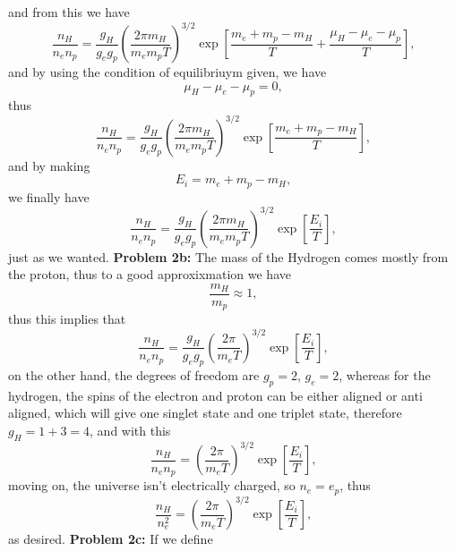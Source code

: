 \documentclass[11pt]{article}
\begin{document}
and from this we have
\begin{displaymath}
  \frac{n_H}{n_e n_p} = \frac{g_H}{g_e g_p} \left(\frac{2\pi m_H}{m_e m_p T}\right)^{3/2} \exp\left[ \frac{m_e + m_p - m_H}{T} + \frac{\mu_H - \mu_e - \mu_p}{T}\right],
\end{displaymath}
and by using the condition of equilibriuym given, we have 
\begin{displaymath}
  \mu_H - \mu_e - \mu_p =0,
\end{displaymath}
thus
\begin{displaymath}
  \frac{n_H}{n_e n_p} = \frac{g_H}{g_e g_p} \left(\frac{2\pi m_H}{m_e m_p T}\right)^{3/2} \exp\left[ \frac{m_e + m_p - m_H}{T}\right],
\end{displaymath}
and by making
\begin{displaymath}
  E_i = m_e + m_p - m_H,
\end{displaymath}
we finally have
\begin{displaymath}
  \frac{n_H}{n_e n_p} = \frac{g_H}{g_e g_p} \left(\frac{2\pi m_H}{m_e m_p T}\right)^{3/2} \exp\left[ \frac{E_i}{T}\right],
\end{displaymath}
just as we wanted.
\newline
\textbf{Problem 2b:}
The mass of the Hydrogen comes mostly from the proton, thus to a good approxixmation we have
\begin{displaymath}
  \frac{m_H}{m_p}\approx 1,
\end{displaymath}
thus this implies that
\begin{displaymath}
  \frac{n_H}{n_e n_p} = \frac{g_H}{g_e g_p} \left(\frac{2\pi }{m_e T}\right)^{3/2} \exp\left[ \frac{E_i}{T}\right],
\end{displaymath}
on the other hand, the degrees of freedom are $g_p=2$, $g_e=2$, whereas for the hydrogen, the spins of the electron and proton can be either aligned or anti aligned, which will give one singlet state and one triplet state, therefore $g_H = 1+3 =4$, and with this
\begin{displaymath}
  \frac{n_H}{n_e n_p} = \left(\frac{2\pi }{m_e T}\right)^{3/2} \exp\left[ \frac{E_i}{T}\right],
\end{displaymath}
moving on, the universe isn't electrically charged, so $n_e=e_p$, thus
\begin{displaymath}
  \frac{n_H}{n_e^2} = \left(\frac{2\pi }{m_e T}\right)^{3/2} \exp\left[\frac{E_i}{T}\right],
\end{displaymath}
as desired.
\newline
\textbf{Problem 2c:} If we define
\end{document}
